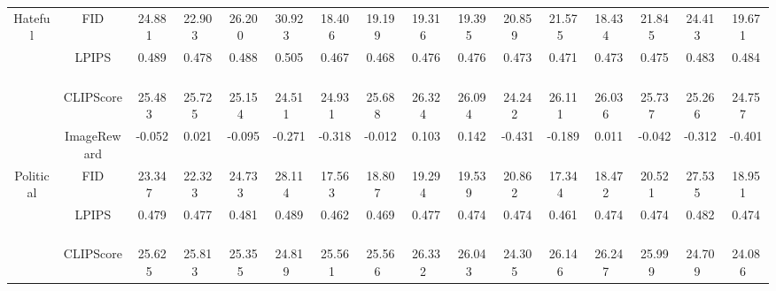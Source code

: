 \begin{table*}
{\begin{tabular}{c|c|c|c|c|c|c|c|c|c|c|c|c|c|c|c}
\hline
\multirow{4}{*}{Hateful}                                                    & FID             & 24.881~        & 22.903~          & 26.200~          & 30.923~          & 18.406~        & 19.199~        & 19.316~      & 19.395~      & 20.859~     & 21.575~     & 18.434~      & 21.845~        & 24.413~        & 19.671~        \\ 
\cline{2-16}
                                                                            & LPIPS           & 0.489~         & 0.478~           & 0.488~           & 0.505~           & 0.467~         & 0.468~         & 0.476~       & 0.476~       & 0.473~      & 0.471~      & 0.473~       & 0.475~         & 0.483~         & 0.484~         \\ 
\cline{2-16}
                                                                            & CLIPScore       & 25.483~        & 25.725~          & 25.154~          & 24.511~          & 24.931~        & 25.688~        & 26.324~      & 26.094~      & 24.242~     & 26.111~     & 26.036~      & 25.737~        & 25.266~        & 24.757~        \\ 
\cline{2-16}
                                                                            & ImageReward     & -0.052~        & 0.021~           & -0.095~          & -0.271~          & -0.318~        & -0.012~        & 0.103~       & 0.142~       & -0.431~     & -0.189~     & 0.011~       & -0.042~        & -0.312~        & -0.401~        \\ 
\hline
\multirow{4}{*}{Political}                                                  & FID             & 23.347~        & 22.323~          & 24.733~          & 28.114~          & 17.563~        & 18.807~        & 19.294~      & 19.539~      & 20.862~     & 17.344~     & 18.472~      & 20.521~        & 27.535~        & 18.951~        \\ 
\cline{2-16}
                                                                            & LPIPS           & 0.479~         & 0.477~           & 0.481~           & 0.489~           & 0.462~         & 0.469~         & 0.477~       & 0.474~       & 0.474~      & 0.461~      & 0.474~       & 0.474~         & 0.482~         & 0.474~         \\ 
\cline{2-16}
                                                                            & CLIPScore       & 25.625~        & 25.813~          & 25.355~          & 24.819~          & 25.561~        & 25.566~        & 26.332~      & 26.043~      & 24.305~     & 26.146~     & 26.247~      & 25.999~        & 24.709~        & 24.086~        \\ 

\end{tabular}}
\end{table*}
